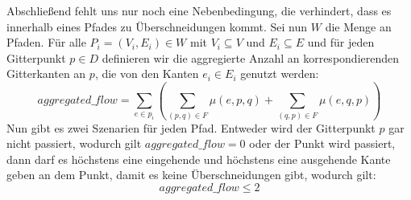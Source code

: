 \documentclass[bachelor, german]{algothesis}
\begin{document}
Abschließend fehlt uns nur noch eine Nebenbedingung, die verhindert, dass es innerhalb eines Pfades zu Überschneidungen kommt. Sei nun $W$ die Menge an Pfaden. Für alle $P_i =(V_i, E_i) \in W$  mit $V_i\subseteq V$ und  $E_i \subseteq E$ und für jeden Gitterpunkt $p \in D$ definieren wir die aggregierte Anzahl an korrespondierenden Gitterkanten an $p$, die von den Kanten $e_i \in E_i$ genutzt werden: $$aggregated\_flow = \sum_{e \in p_i}(\sum_{(p,q) \in F} \mu(e,p,q) + \sum_{(q,p) \in F} \mu(e,q,p))$$  Nun gibt es zwei Szenarien für jeden Pfad. Entweder wird der Gitterpunkt $p$ gar nicht passiert, wodurch gilt $aggregated\_flow = 0$ oder der Punkt wird passiert, dann darf es höchstens eine eingehende und höchstens eine ausgehende Kante geben an dem Punkt, damit es keine Überschneidungen gibt, wodurch gilt:
\begin{equation}
    aggregated\_flow \leq 2
    \tag{5}
\end{equation} 
\end{document}
